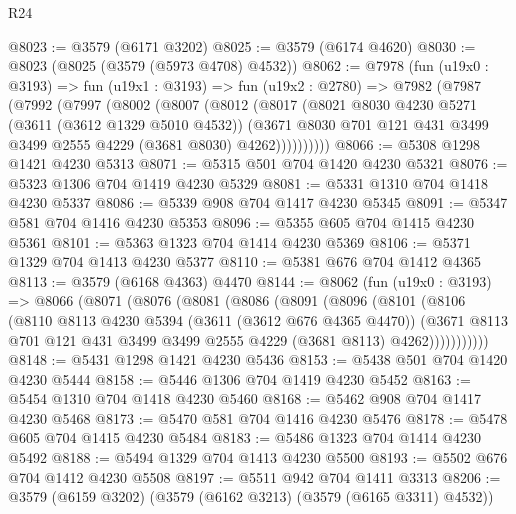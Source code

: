 \begin{lexlean}{R24}
\begin{coremodule}
@8023 := @3579 (@6171 @3202)
@8025 := @3579 (@6174 @4620)
@8030 := @8023 (@8025 (@3579 (@5973 @4708) @4532))
@8062 := @7978
    (fun (u19x0 : @3193) =>
    fun (u19x1 : @3193) =>
    fun (u19x2 : @2780) =>
    @7982
      (@7987
        (@7992
          (@7997
            (@8002
              (@8007
                (@8012
                  (@8017
                    (@8021
                      @8030
                      @4230
                      @5271
                      (@3611 (@3612 @1329 @5010 @4532))
                      (@3671
                        @8030
                        @701
                        @121
                        @431
                        @3499
                        @3499
                        @2555
                        @4229
                        (@3681 @8030)
                        @4262))))))))))
@8066 := @5308 @1298 @1421 @4230 @5313
@8071 := @5315 @501 @704 @1420 @4230 @5321
@8076 := @5323 @1306 @704 @1419 @4230 @5329
@8081 := @5331 @1310 @704 @1418 @4230 @5337
@8086 := @5339 @908 @704 @1417 @4230 @5345
@8091 := @5347 @581 @704 @1416 @4230 @5353
@8096 := @5355 @605 @704 @1415 @4230 @5361
@8101 := @5363 @1323 @704 @1414 @4230 @5369
@8106 := @5371 @1329 @704 @1413 @4230 @5377
@8110 := @5381 @676 @704 @1412 @4365
@8113 := @3579 (@6168 @4363) @4470
@8144 := @8062
    (fun (u19x0 : @3193) =>
    @8066
      (@8071
        (@8076
          (@8081
            (@8086
              (@8091
                (@8096
                  (@8101
                    (@8106
                      (@8110
                        @8113
                        @4230
                        @5394
                        (@3611 (@3612 @676 @4365 @4470))
                        (@3671
                          @8113
                          @701
                          @121
                          @431
                          @3499
                          @3499
                          @2555
                          @4229
                          (@3681 @8113)
                          @4262)))))))))))
@8148 := @5431 @1298 @1421 @4230 @5436
@8153 := @5438 @501 @704 @1420 @4230 @5444
@8158 := @5446 @1306 @704 @1419 @4230 @5452
@8163 := @5454 @1310 @704 @1418 @4230 @5460
@8168 := @5462 @908 @704 @1417 @4230 @5468
@8173 := @5470 @581 @704 @1416 @4230 @5476
@8178 := @5478 @605 @704 @1415 @4230 @5484
@8183 := @5486 @1323 @704 @1414 @4230 @5492
@8188 := @5494 @1329 @704 @1413 @4230 @5500
@8193 := @5502 @676 @704 @1412 @4230 @5508
@8197 := @5511 @942 @704 @1411 @3313
@8206 := @3579 (@6159 @3202) (@3579 (@6162 @3213) (@3579 (@6165 @3311) @4532))

\end{coremodule}
\end{lexlean}
